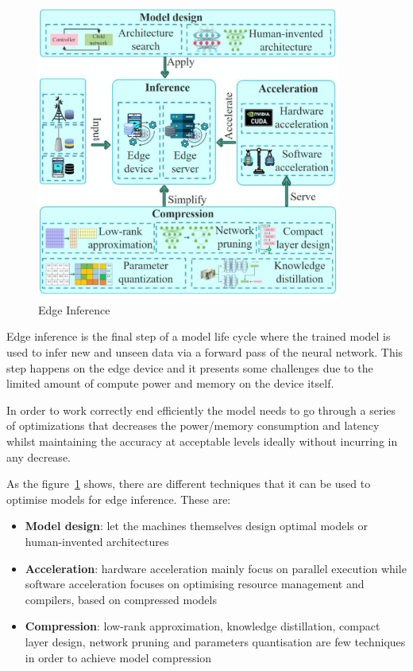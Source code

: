 \begin{figure}[ht]
    \includegraphics[width=10cm]{images/introduction/edge_inference.png}
    \centering
    \caption{Edge Inference}\label{fig:edge_inference}
\end{figure}

Edge inference is the final step of a model life cycle where the trained model
is used to infer new and unseen data via a forward pass of the neural network.
This step happens on the edge device and it presents some challenges due to the
limited amount of compute power and memory on the device itself.

In order to work correctly end efficiently the model needs to go through a
series of optimizations that decreases the power/memory consumption and latency
whilst maintaining the accuracy at acceptable levels \- ideally without
incurring in any decrease.

As the figure~\ref{fig:edge_inference} shows, there are different techniques
that it can be used to optimise models for edge inference. These are:
\begin{itemize}
    \item \textbf{Model design}: let the machines themselves design optimal
        models or human-invented architectures
    \item \textbf{Acceleration}: hardware acceleration mainly focus on parallel
        execution while software acceleration focuses on optimising resource
        management and compilers, based on compressed models
    \item \textbf{Compression}: low-rank approximation, knowledge distillation,
        compact layer design, network pruning and parameters quantisation are
        few techniques in order to achieve model compression
\end{itemize}

